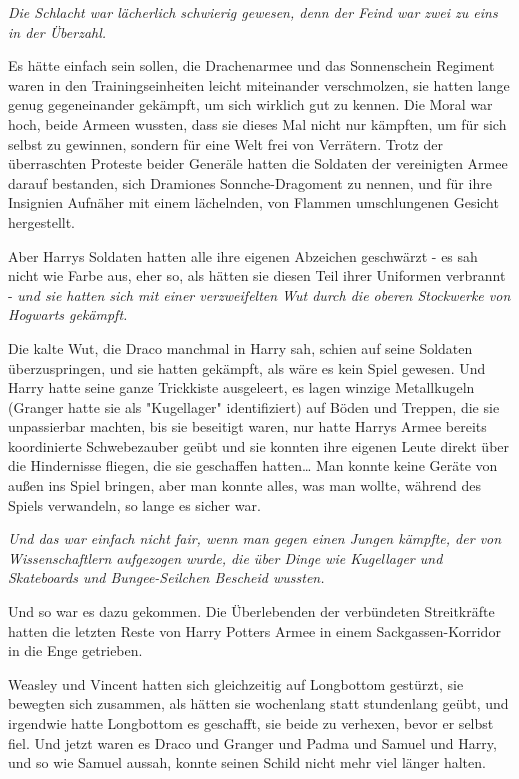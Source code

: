 {\emph{Die Schlacht war lächerlich schwierig gewesen, denn der Feind war zwei zu eins in der Überzahl.}

Es hätte einfach sein sollen, die Drachenarmee und das Sonnenschein Regiment waren in den Trainingseinheiten leicht miteinander verschmolzen, sie hatten lange genug gegeneinander gekämpft, um sich wirklich gut zu kennen. Die Moral war hoch, beide Armeen wussten, dass sie dieses Mal nicht nur kämpften, um für sich selbst zu gewinnen, sondern für eine Welt frei von Verrätern. Trotz der überraschten Proteste beider Generäle hatten die Soldaten der vereinigten Armee darauf bestanden, sich Dramiones Sonnche-Dragoment zu nennen, und für ihre Insignien Aufnäher mit einem lächelnden, von Flammen umschlungenen Gesicht hergestellt.

Aber Harrys Soldaten hatten alle ihre eigenen Abzeichen geschwärzt - es sah nicht wie Farbe aus, eher so, als hätten sie diesen Teil ihrer Uniformen verbrannt - \emph{und sie hatten sich mit einer verzweifelten Wut durch die oberen Stockwerke von Hogwarts gekämpft.}

Die kalte Wut, die Draco manchmal in Harry sah, schien auf seine Soldaten überzuspringen, und sie hatten gekämpft, als wäre es kein Spiel gewesen. Und Harry hatte seine ganze Trickkiste ausgeleert, es lagen winzige Metallkugeln (Granger hatte sie als "Kugellager" identifiziert) auf Böden und Treppen, die sie unpassierbar machten, bis sie beseitigt waren, nur hatte Harrys Armee bereits koordinierte Schwebezauber geübt und sie konnten ihre eigenen Leute direkt über die Hindernisse fliegen, die sie geschaffen hatten… Man konnte keine Geräte von außen ins Spiel bringen, aber man konnte alles, was man wollte, während des Spiels verwandeln, so lange es sicher war.

\emph{Und das war einfach nicht fair, wenn man gegen einen Jungen kämpfte, der von Wissenschaftlern aufgezogen wurde, die über Dinge wie Kugellager und Skateboards und Bungee-Seilchen Bescheid wussten.}

Und so war es dazu gekommen. Die Überlebenden der verbündeten Streitkräfte hatten die letzten Reste von Harry Potters Armee in einem Sackgassen-Korridor in die Enge getrieben.

Weasley und Vincent hatten sich gleichzeitig auf Longbottom gestürzt, sie bewegten sich zusammen, als hätten sie wochenlang statt stundenlang geübt, und irgendwie hatte Longbottom es geschafft, sie beide zu verhexen, bevor er selbst fiel. Und jetzt waren es Draco und Granger und Padma und Samuel und Harry, und so wie Samuel aussah, konnte seinen Schild nicht mehr viel länger halten.

}
